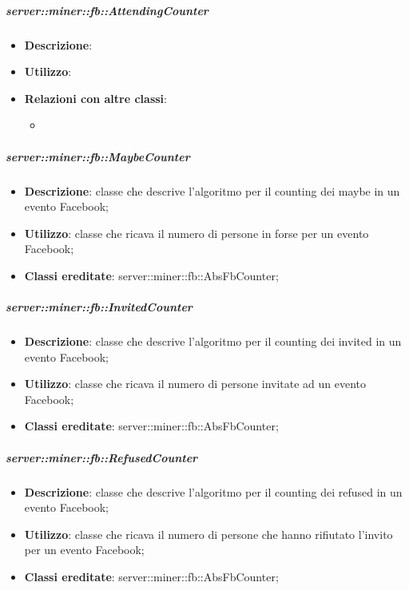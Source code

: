 		\subparagraph{server::miner::fb::AttendingCounter} %
		\label{subp:server_miner_fb_AttendingCounter}
			\begin{itemize}
				\item \textbf{Descrizione}:
				\item \textbf{Utilizzo}: 
				\item \textbf{Relazioni con altre classi}:
					\begin{itemize}
						\item 
					\end{itemize}
			\end{itemize}
	
		\subparagraph{server::miner::fb::MaybeCounter} %
		\label{subp:server_miner_fb_MaybeCounter}
			\begin{itemize}
				\item \textbf{Descrizione}: classe che descrive l'algoritmo per il counting dei maybe in un evento Facebook;
				\item \textbf{Utilizzo}: classe che ricava il numero di persone in forse per un evento Facebook;
				\item \textbf{Classi ereditate}: server::miner::fb::AbsFbCounter;
			\end{itemize}
	
	\subparagraph{server::miner::fb::InvitedCounter} %
		\label{subp:server_miner_fb_InvitedCunter}
			\begin{itemize}
				\item \textbf{Descrizione}: classe che descrive l'algoritmo per il counting dei invited in un evento Facebook;
				\item \textbf{Utilizzo}: classe che ricava il numero di persone invitate ad un evento Facebook;
				\item \textbf{Classi ereditate}: server::miner::fb::AbsFbCounter;
			\end{itemize}

	\subparagraph{server::miner::fb::RefusedCounter} %
		\label{subp:server_miner_fb_RefusedCounter}
			\begin{itemize}
				\item \textbf{Descrizione}: classe che descrive l'algoritmo per il counting dei refused in un evento Facebook;
				\item \textbf{Utilizzo}: classe che ricava il numero di persone che hanno rifiutato l'invito per un evento Facebook;
				\item \textbf{Classi ereditate}: server::miner::fb::AbsFbCounter;
			\end{itemize}
	
